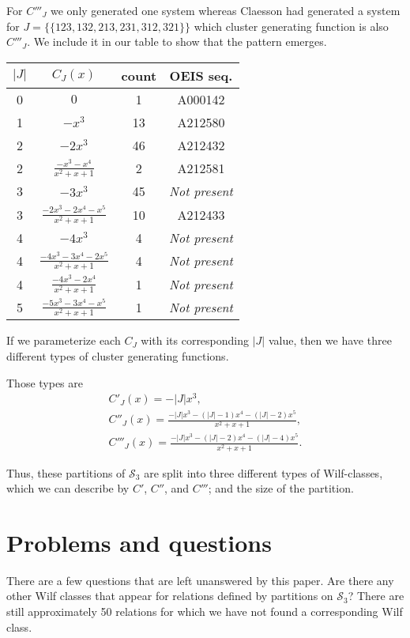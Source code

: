 \documentclass[a4paper, 11pt, english]{article}
\theoremstyle{definition}
\newcommand{\Sym}{\mathcal{S}}
\begin{document}
For $C'''_J$ we only generated one system whereas Claesson had generated a system for
$J = \{\{ 123, 132, 213, 231, 312, 321 \}\}$ which cluster generating function
is also $C'''_J$. We include it in our table to show that the pattern emerges.


\begin{center}
\begin{tabular}{c|c|c|c}
    $|J|$ & $C_J(x)$ & count & OEIS seq. \\
    \hline
    0 & $0$ & 1 & A000142 \\
    1 & $-x^3$ & 13 & A212580 \\
    2 & $-2x^3$ & 46 & A212432 \\
    2 & $\frac{-x^3-x^4}{x^2+x+1}$ & 2 & A212581 \\
    3 & $-3x^3$ & 45 & \emph{Not present} \\
    3 & $\frac{-2x^3-2x^4-x^5}{x^2+x+1}$ & 10 & A212433 \\
    4 & $-4x^3$ & 4 & \emph{Not present} \\
    4 & $\frac{-4x^3-3x^4-2x^5}{x^2+x+1}$ & 4 & \emph{Not present}\\
    4 & $\frac{-4x^3-2x^4}{x^2+x+1}$ & 1 & \emph{Not present} \\ 
    \hline
    \hline
    5 & $\frac{-5x^3-3x^4-x^5}{x^2+x+1}$ & 1 & \emph{Not present} \\ 
\end{tabular}
\end{center}
If we parameterize each $C_J$ with its corresponding $|J|$ value, then we have
three different types of cluster generating functions.

Those types are 
\begin{gather*}
  C'_J(x) = -|J|x^3, \\
  C''_J(x) = \frac{-|J|x^3-(|J|-1)x^4-(|J|-2)x^5}{x^2+x+1}, \\
  C'''_J(x) = \frac{-|J|x^3-(|J|-2)x^4-(|J|-4)x^5}{x^2+x+1}.
\end{gather*}

Thus, these partitions of $\Sym_3$ are split into three different types
of Wilf-classes, which we can describe by $C'$, $C''$, and $C'''$; and the size
of the partition.

\section{Problems and questions}
There are a few questions that are left unanswered by this paper.
Are there any other Wilf classes that appear for relations defined by partitions on $\Sym_3$? There are
still approximately 50 relations for which we have not found a corresponding Wilf class. 
\end{document}
